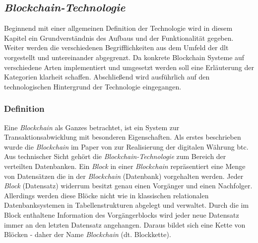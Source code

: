 \subsection{\textit{Blockchain-Technologie}} \label{sec:blockchain-technology}
Beginnend mit einer allgemeinen Definition der Technologie wird in diesem Kapitel ein Grundverständnis des Aufbaus und der Funktionalität gegeben. Weiter werden die verschiedenen Begrifflichkeiten aus dem Umfeld der \acf{dlt} vorgestellt und untereinander abgegrenzt. Da konkrete Blockchain Systeme auf verschiedene Arten implementiert und umgesetzt werden soll eine Erläuterung der Kategorien klarheit schaffen. Abschließend wird ausführlich auf den technologischen Hintergrund der Technologie eingegangen.

\subsubsection{Definition} \label{blockchain-definition}
Eine \textit{Blockchain} als Ganzes betrachtet, ist ein System zur Transaktionsabwicklung mit besonderen Eigenschaften. Als erstes beschrieben wurde die \textit{Blockchain} im Paper von \cite{Nakamoto2009} zur Realisierung der digitalen Währung \ac{btc}. Aus technischer Sicht gehört die \textit{Blockchain-Technologie} zum Bereich der verteilten Datenbanken. Ein \textit{Block} in einer \textit{Blockchain} repräsentiert eine Menge von Datensätzen die in der \textit{Blockchain} (Datenbank) vorgehalten werden. Jeder \textit{Block} (Datensatz) widerrum besitzt genau einen Vorgänger und einen Nachfolger. Allerdings werden diese Blöcke nicht wie in klassischen relationalen Datenbanksystemen in Tabellenstrukturen abgelegt und verwaltet. Durch die im Block enthaltene Information des Vorgängerblocks wird jeder neue Datensatz immer an den letzten Datensatz angehangen. Daraus bildet sich eine Kette von Blöcken - daher der Name \textit{Blockchain} (dt. Blockkette).

